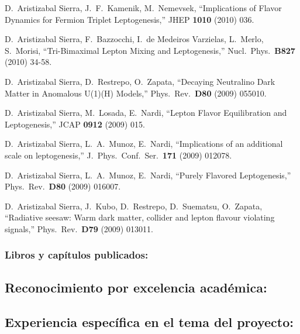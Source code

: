   D.~Aristizabal Sierra, J.~F.~Kamenik, M.~Nemevsek,
  ``Implications of Flavor Dynamics for Fermion Triplet Leptogenesis,''
  JHEP {\bf 1010 } (2010)  036.

  D.~Aristizabal Sierra, F.~Bazzocchi, I.~de Medeiros Varzielas, L.~Merlo, S.~Morisi,
  ``Tri-Bimaximal Lepton Mixing and Leptogenesis,''
  Nucl.\ Phys.\  {\bf B827 } (2010)  34-58.

  D.~Aristizabal Sierra, D.~Restrepo, O.~Zapata,
  ``Decaying Neutralino Dark Matter in Anomalous U(1)(H) Models,''
  Phys.\ Rev.\  {\bf D80 } (2009)  055010.

  D.~Aristizabal Sierra, M.~Losada, E.~Nardi,
  ``Lepton Flavor Equilibration and Leptogenesis,''
  JCAP {\bf 0912 } (2009)  015.

  D.~Aristizabal Sierra, L.~A.~Munoz, E.~Nardi,
  ``Implications of an additional scale on leptogenesis,''
  J.\ Phys.\ Conf.\ Ser.\  {\bf 171 } (2009)  012078.

  D.~Aristizabal Sierra, L.~A.~Munoz, E.~Nardi,
  ``Purely Flavored Leptogenesis,''
  Phys.\ Rev.\  {\bf D80 } (2009)  016007.

  D.~Aristizabal Sierra, J.~Kubo, D.~Restrepo, D.~Suematsu, O.~Zapata,
  ``Radiative seesaw: Warm dark matter, collider and lepton flavour violating signals,''
  Phys.\ Rev.\  {\bf D79 } (2009)  013011.
\subsubsection{Libros y capítulos publicados:}
\subsection{Reconocimiento por excelencia académica:}
\subsection{Experiencia específica en el tema del proyecto:}
